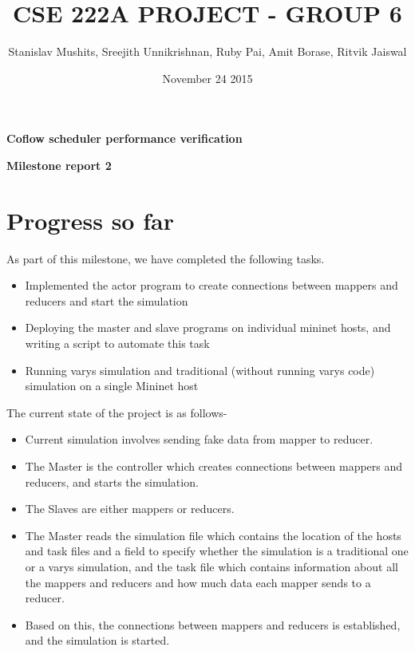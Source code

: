 \documentclass{article}
\title{CSE 222A PROJECT - GROUP 6}
\author{Stanislav Mushits, Sreejith Unnikrishnan, Ruby Pai, Amit Borase, Ritvik Jaiswal }
\date{November 24 2015}
\begin{document}
\maketitle

\begin{center}
\textbf{Coflow scheduler performance verification}
\end{center}

\begin{center}
\textbf{Milestone report 2}
\end{center}

\section{Progress so far}
As part of this milestone, we have completed the following tasks.
\begin{itemize}
	\item Implemented the actor program to create connections between mappers and reducers and start the simulation
	\item Deploying the master and slave programs on individual mininet hosts, and writing a script to automate this task
	\item Running varys simulation and traditional (without running varys code) simulation on a single Mininet host
\end{itemize}
The current state of the project is as follows-
\begin{itemize}
	\item Current simulation involves sending fake data from mapper to reducer.
	\item The Master is the controller which creates connections between mappers and reducers, and starts the simulation.
	\item The Slaves are either mappers or reducers.
	\item The Master reads the simulation file which contains the location of the hosts and task files and a field to specify whether the simulation is a traditional one or a varys simulation, and the task file which contains information about all the mappers and reducers and how much data each mapper sends to a reducer.
	\item Based on this, the connections between mappers and reducers is established, and the simulation is started.
\end{itemize}
\end{document}
